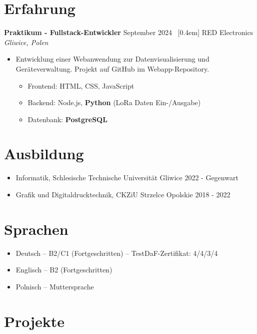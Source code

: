 \documentclass[11pt,letterpaper]{article}
\newcommand{\spacedSection}[1]{
  \vspace{0.1em}
  \section{#1}
  \vspace{1em}
}
\begin{document}
\vspace{1em}
\spacedSection{Erfahrung}

\textbf{Praktikum - Fullstack-Entwickler} \hfill September 2024 \ [0.4em]
RED Electronics \hfill \textit{Gliwice, Polen}
\begin{itemize}[leftmargin=0.5cm]
    \itemsep-3pt {}
    \item Entwicklung einer Webanwendung zur Datenvisualisierung und Geräteverwaltung.
    Projekt auf GitHub im Webapp-Repository.
    \begin{itemize}[leftmargin=0.5cm]
        \itemsep-3pt {}
        \item Frontend: HTML, CSS, JavaScript
        \item Backend: Node.js, \textbf{Python} (LoRa Daten Ein-/Ausgabe)
        \item Datenbank: \textbf{PostgreSQL}
    \end{itemize}
\end{itemize}

\spacedSection{Ausbildung}

\begin{itemize}[leftmargin=0.5cm]
\itemsep-3pt {}
    \item Informatik, Schlesische Technische Universität Gliwice \hfill {2022 - Gegenwart}
    \item Grafik und Digitaldrucktechnik, CKZiU Strzelce Opolskie \hfill {2018 - 2022}
\end{itemize}

\spacedSection{Sprachen}

\begin{itemize}[leftmargin=0.5cm]
    \itemsep-3pt {}
    \item Deutsch – B2/C1 (Fortgeschritten) – TestDaF-Zertifikat: 4/4/3/4
    \item Englisch – B2 (Fortgeschritten)
    \item Polnisch – Muttersprache
\end{itemize}

\spacedSection{Projekte}
\end{document}
